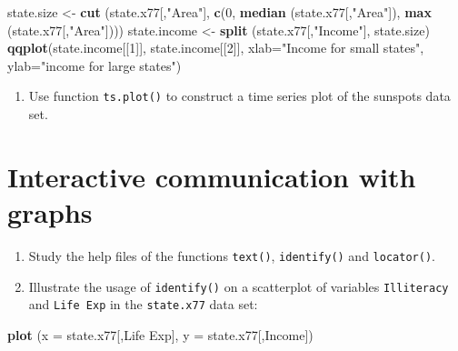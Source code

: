 \documentclass[
]{book}
\newenvironment{Shaded}{\begin{snugshade}}{\end{snugshade}}
\newcommand{\AttributeTok}[1]{\textcolor[rgb]{0.13,0.29,0.53}{#1}}
\newcommand{\DecValTok}[1]{\textcolor[rgb]{0.00,0.00,0.81}{#1}}
\newcommand{\FunctionTok}[1]{\textcolor[rgb]{0.13,0.29,0.53}{\textbf{#1}}}
\newcommand{\NormalTok}[1]{#1}
\newcommand{\OtherTok}[1]{\textcolor[rgb]{0.56,0.35,0.01}{#1}}
\newcommand{\StringTok}[1]{\textcolor[rgb]{0.31,0.60,0.02}{#1}}
\providecommand{\tightlist}{%
  \setlength{\itemsep}{0pt}\setlength{\parskip}{0pt}}
\begin{document}
\begin{Shaded}
\begin{Highlighting}[]
\NormalTok{state.size }\OtherTok{\textless{}{-}} \FunctionTok{cut}\NormalTok{ (state.x77[,}\StringTok{"Area"}\NormalTok{],  }
                   \FunctionTok{c}\NormalTok{(}\DecValTok{0}\NormalTok{, }\FunctionTok{median}\NormalTok{ (state.x77[,}\StringTok{"Area"}\NormalTok{]), }\FunctionTok{max}\NormalTok{ (state.x77[,}\StringTok{"Area"}\NormalTok{])))}
\NormalTok{state.income }\OtherTok{\textless{}{-}} \FunctionTok{split}\NormalTok{ (state.x77[,}\StringTok{"Income"}\NormalTok{], state.size)}
\FunctionTok{qqplot}\NormalTok{(state.income[[}\DecValTok{1}\NormalTok{]], state.income[[}\DecValTok{2}\NormalTok{]], }\AttributeTok{xlab=}\StringTok{"Income for small states"}\NormalTok{, }
       \AttributeTok{ylab=}\StringTok{"income for large states"}\NormalTok{)}
\end{Highlighting}
\end{Shaded}

\begin{enumerate}
\def\labelenumi{(\alph{enumi})}
\setcounter{enumi}{17}
\tightlist
\item
  Use function \texttt{ts.plot()} to construct a time series plot of the sunspots data set.
\end{enumerate}

\section{Interactive communication with graphs}\label{interactive-communication-with-graphs}

\begin{enumerate}
\def\labelenumi{(\alph{enumi})}
\item
  Study the help files of the functions \texttt{text()}, \texttt{identify()} and \texttt{locator()}.
\item
  Illustrate the usage of \texttt{identify()} on a scatterplot of variables \texttt{Illiteracy} and \texttt{Life\ Exp} in the \texttt{state.x77} data set:
\end{enumerate}

\begin{Shaded}
\begin{Highlighting}[]
\FunctionTok{plot}\NormalTok{ (}\AttributeTok{x =}\NormalTok{ state.x77[,}\StringTok{\textquotesingle{}Life Exp\textquotesingle{}}\NormalTok{], }\AttributeTok{y =}\NormalTok{ state.x77[,}\StringTok{\textquotesingle{}Income\textquotesingle{}}\NormalTok{])}
\end{Highlighting}
\end{Shaded}
\end{document}
